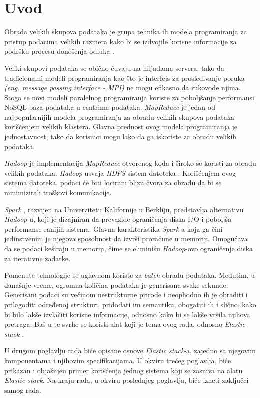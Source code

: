 \chapter{Uvod}
Obrada velikih skupova podataka je grupa tehnika ili modela programiranja za pristup podacima velikih razmera kako bi se izdvojile korisne informacije za podršku procesu donošenja odluka \cite{noauthor_2016-ll}.

\par
Veliki skupovi podataka se obično čuvaju na hiljadama servera, tako da tradicionalni modeli programiranja kao što je interfejs za prosleđivanje poruka \textit{(eng. message passing interface - MPI)} \cite{open-mpi} ne mogu efikasno da rukovode njima. Stoga se novi modeli paralelnog programiranja koriste za poboljšanje performansi NoSQL baza podataka u centrima podataka. \textit{MapReduce} \cite{map-reduce} je jedan od najpopularnijih modela programiranja za obradu velikih skupova podataka korišćenjem velikih klastera. Glavna prednost ovog modela programiranja je jednostavnost, tako da korisnici mogu lako da ga iskoriste za obradu velikih podataka.

\par
\textit{Hadoop} \cite{hadoop} je implementacija \textit{MapReduce} otvorenog koda i široko se koristi za obradu velikih podataka. \textit{Hadoop} usvaja \textit{HDFS} sistem datoteka \cite{hadoop}. Korišćenjem ovog sistema datoteka, podaci će biti locirani blizu čvora za obradu da bi se minimizirali troškovi komunikacije.

\par
\textit{Spark} \cite{spark}, razvijen na Univerzitetu Kalifornije u Berkliju, predstavlja alternativu \textit{Hadoop}-u, koji je dizajniran da prevaziđe ograničenja diska I/O i poboljša performanse ranijih sistema. Glavna karakteristika \textit{Spark}-a koja ga čini jedinstvenim je njegova sposobnost da izvrši proračune u memoriji. Omogućava da se podaci keširaju u memoriji, čime se eliminišu \textit{Hadoop}-ovo ograničenje diska za iterativne zadatke.

\par
Pomenute tehnologije se uglavnom koriste za \textit{batch} obradu podataka. Međutim, u današnje vreme, ogromna količina podataka je generisana svake sekunde. Generisani podaci su većinom nestrukturne prirode i neophodno ih je obraditi i prilagoditi određenoj strukturi, pridodati im semantiku, obogatiti ih i slično, kako bi bilo lakše izvlačiti korisne informacije, odnosno kako bi se lakše vršila njihova pretraga. Baš u te svrhe se koristi alat koji je tema ovog rada, odnosno \textit{Elastic stack} \cite{elastic-stack-docs}.

\par
U drugom poglavlju rada biće opisane osnove \textit{Elastic stack}-a, zajedno sa njegovim komponentama i njihovim specifikacijama. U okviru trećeg poglavlja, biće prikazan i objašnjen primer korišćenja jednog sistema koji se zasniva na alatu \textit{Elastic stack}. Na kraju rada, u okviru poslednjeg poglavlja, biće izneti zaključci samog rada.